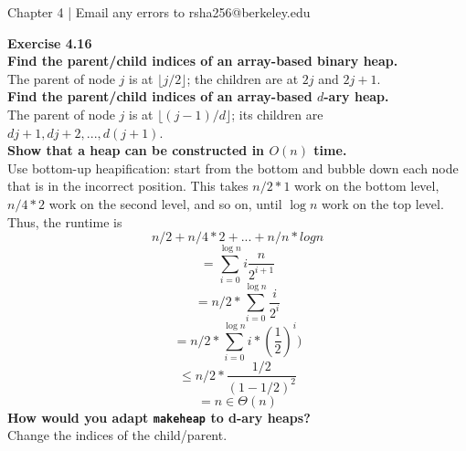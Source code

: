 \documentclass{article}
\newenvironment{problem}[2][Exercise]
    { \begin{mdframed}[backgroundcolor=gray!20] \textbf{#1 #2} \\}
    {  \end{mdframed}}
\begin{document}
\begin{mdframed}[backgroundcolor=blue!20]
Chapter 4 | Email any errors to rsha256@berkeley.edu
\end{mdframed}
 
\begin{problem}{4.16}
\textbf{Find the parent/child indices of an array-based binary heap.}
\\
The parent of node $j$ is at $\lfloor{j}/2\rfloor$; the children are at $2j$ and $2j + 1$.
\\
\textbf{Find the parent/child indices of an array-based $d$-ary heap.}
\\
The parent of node $j$ is at $\lfloor{(j - 1) / d}\rfloor$; its children are $dj + 1, dj + 2, ..., d(j + 1)$.
\\
\textbf{Show that a heap can be constructed in $O(n)$ time.}
\\
Use bottom-up heapification: start from the bottom and bubble down each node that is in the incorrect position. This takes $n / 2 * 1$ work on the bottom level, $n / 4 * 2$ work on the second level, and so on, until $\log n$ work on the top level. Thus, the runtime is 
    \[
        n / 2 + n / 4 * 2 + ... + n / n * log n
    \]
    \[
        = \sum_{i = 0}^{\log n} i \frac{n}{2^{i + 1}}
    \]
    \[
        = n/2 * \sum_{i = 0}^{\log n} \frac{i}{2^i}
    \]
    \[
        = n/2 * \sum_{i = 0}^{\log n} i * (\frac{1}{2})^i)
    \]
    \[
        \leq n/2 * \frac{1/2}{(1 - 1/2)^2}
    \]
    \[
        = n \in \Theta(n)
    \]
\textbf{How would you adapt \texttt{makeheap} to d-ary heaps?}
\\ 
Change the indices of the child/parent.
\end{problem}
\end{document}

